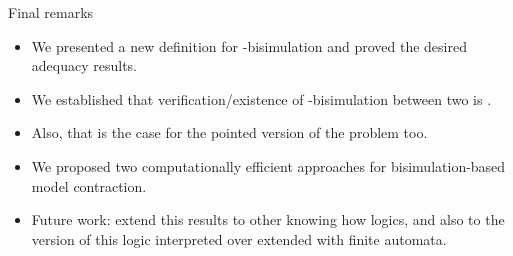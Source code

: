 \documentclass{beamer}
\begin{document}
\begin{frame}
    {Final remarks}

    \begin{small}
        \begin{itemize}
            \item We presented a new definition for \KHilogic-bisimulation and proved the desired adequacy results. \pause
            \item We established that verification/existence of \KHilogic-bisimulation between two \ultss is \coNPComplete. \pause
            \item Also, that is the case for the pointed version of the problem too. \pause
            \item We proposed two computationally efficient approaches for bisimulation-based model contraction. \pause
            \item Future work: extend this results to other knowing how logics, and also to the version of this logic interpreted 
            over \ults extended with finite automata.
        \end{itemize}
    \end{small}
\end{frame}

\end{document}
